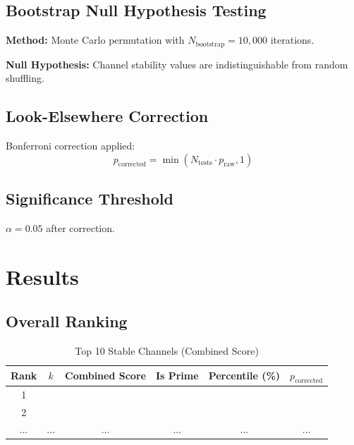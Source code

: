 \documentclass[11pt,a4paper]{article}
\begin{document}
\subsection{Bootstrap Null Hypothesis Testing}

\textbf{Method:} Monte Carlo permutation with $N_{\text{bootstrap}} = 10{,}000$ iterations.

\textbf{Null Hypothesis:} Channel stability values are indistinguishable from random shuffling.

\subsection{Look-Elsewhere Correction}

Bonferroni correction applied:
\begin{equation}
p_{\text{corrected}} = \min(N_{\text{tests}} \cdot p_{\text{raw}}, 1)
\end{equation}

\subsection{Significance Threshold}

$\alpha = 0.05$ after correction.

\section{Results}


\subsection{Overall Ranking}

\begin{table}[H]
\centering
\caption{Top 10 Stable Channels (Combined Score)}
\begin{tabular}{@{}cccccc@{}}
\toprule
Rank & $k$ & Combined Score & Is Prime & Percentile (\%) & $p_{\text{corrected}}$ \\ \midrule
1    &     &                &          &                 &                        \\
2    &     &                &          &                 &                        \\
...  & ... & ...            & ...      & ...             & ...                    \\ \bottomrule
\end{tabular}
\label{tab:top10}
\end{table}
\end{document}
